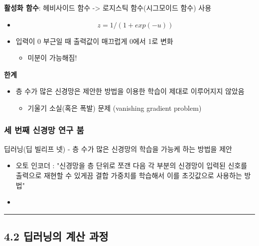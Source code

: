 \documentclass[]{article}
\providecommand{\tightlist}{%
  \setlength{\itemsep}{0pt}\setlength{\parskip}{0pt}}
\begin{document}
\textbf{활성화 함수}: 헤비사이드 함수 -\textgreater{} 로지스틱
함수(시그모이드 함수) 사용

\begin{itemize}
\tightlist
\item
  \[z=1/(1+exp(-u))\]
\end{itemize}

\begin{itemize}
\item
  입력이 0 부근일 때 출력값이 매끄럽게 0에서 1로 변화

  \begin{itemize}
  \item
    미분이 가능해짐!
  \end{itemize}
\end{itemize}

\textbf{한계}

\begin{itemize}
\item
  층 수가 많은 신경망은 제안한 방법을 이용한 학습이 제대로 이루어지지
  않았음

  \begin{itemize}
  \item
    기울기 소실(혹은 폭발) 문제 (vanishing gradient problem)
  \end{itemize}
\end{itemize}

\hypertarget{header-n41}{%
\subsubsection{세 번째 신경망 연구 붐}\label{header-n41}}

딥러닝(딥 빌리프 넷) - 층 수가 많은 신경망의 학습을 가능케 하는 방법을
제안

\begin{itemize}
\item
  오토 인코더 : "신경망을 층 단위로 쪼갠 다음 각 부분의 신경망이 입력된
  신호를 출력으로 재현할 수 있게끔 결합 가중치를 학습해서 이를
  초깃값으로 사용하는 방법"
\item
\end{itemize}

\begin{center}\rule{0.5\linewidth}{\linethickness}\end{center}

\hypertarget{header-n49}{%
\subsection{4.2 딥러닝의 계산 과정}\label{header-n49}}
\end{document}
